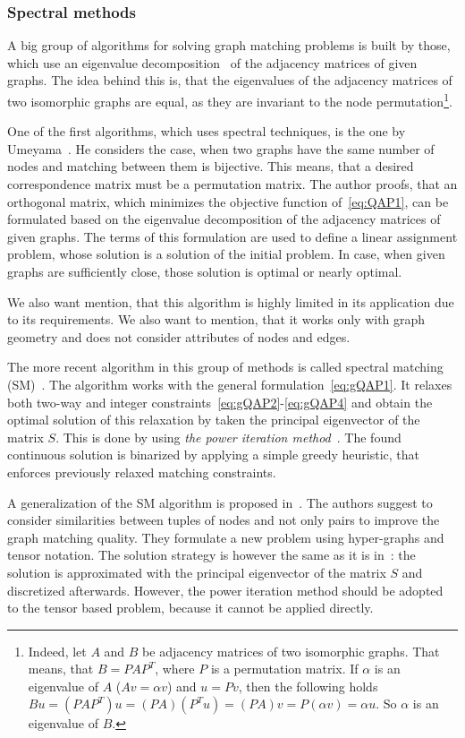 \subsubsection{Spectral methods}
A big group of algorithms for solving graph matching problems is built by those, which use an eigenvalue decomposition~\cite{Book_ConvOpt} of the adjacency matrices of given graphs. The idea behind this is, that the eigenvalues of the adjacency matrices of two isomorphic graphs are equal, as they are invariant to the node permutation\footnote{Indeed, let $A$ and $B$ be adjacency matrices of two isomorphic graphs. That means, that $B=PAP^T$, where $P$ is a permutation matrix. If $\alpha$ is an eigenvalue of $A$ ($Av=\alpha v$) and $u=Pv$, then the following holds $Bu=(PAP^T)u=(PA)(P^Tu)=(PA)v=P(\alpha v)=\alpha u$. So $\alpha$ is an eigenvalue of $B$.}.

One of the first algorithms, which uses spectral techniques, is the one by Umeyama\newline~\cite{Umeyam1988}. He considers the case, when two graphs have the same number of nodes and matching between them is bijective. This means, that a desired correspondence matrix must be a permutation matrix. The author proofs, that an orthogonal matrix, which minimizes the objective function of~\eqref{eq:QAP1}, can be formulated based on the eigenvalue decomposition of the adjacency matrices of given graphs. The terms of this formulation are used to define a linear assignment problem, whose solution is a solution of the initial problem. In case, when given graphs are sufficiently close, those solution is optimal or nearly optimal.

We also want mention, that this algorithm is highly limited in its application due to its requirements. We also want to mention, that it works only with graph geometry and does not consider attributes of nodes and edges.

The more recent algorithm in this group of methods is called spectral matching (SM)~\cite{Leordeanu2005_SM}. The algorithm works with the general formulation~\eqref{eq:gQAP1}. It relaxes both two-way and integer constraints~\eqref{eq:gQAP2}-\eqref{eq:gQAP4} and obtain the optimal solution of this relaxation by taken the principal eigenvector of the matrix $S$. This is done by using \emph{the power iteration method}~\cite{PowerIteration}. The found continuous solution is binarized by applying a simple greedy heuristic, that enforces previously relaxed matching constraints.

A generalization of the SM algorithm is proposed in~\cite{Duchenne2011}. The authors suggest to consider similarities between tuples of nodes and not only pairs to improve the graph matching quality. They formulate a new problem using hyper-graphs and tensor notation. The solution strategy is however the same as it is in~\cite{Leordeanu2005_SM}: the solution is approximated with the principal eigenvector of the matrix $S$ and discretized afterwards. However, the power iteration method should be adopted to the tensor based problem, because it cannot be applied directly.

